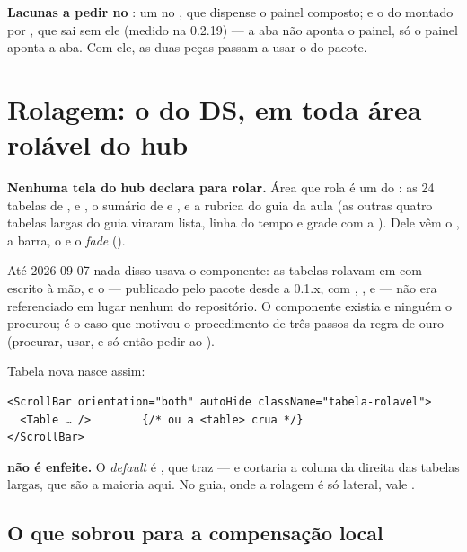 \textbf{Lacunas a pedir no }: um  no
, que dispense o painel composto; e o  do 
montado por , que sai sem ele (medido na 0.2.19) --- a aba não
aponta o painel, só o painel aponta a aba. Com ele, as duas peças passam a usar
o  do pacote.

\section{Rolagem: o  do DS, em toda área rolável do hub}
\label{ds:rolagem}

\textbf{Nenhuma tela do hub declara  para rolar.} Área que rola é um
 do : as 24 tabelas de ,
 e , o sumário de  e
, e a rubrica do guia da aula (as outras quatro tabelas largas do
guia viraram lista, linha do tempo e grade com a ). Dele vêm o ,
a barra, o  e o \emph{fade} ().

Até 2026-09-07 nada disso usava o componente: as tabelas rolavam em 
com  escrito à mão, e o  --- publicado pelo pacote
desde a 0.1.x, com , ,  e 
--- não era referenciado em lugar nenhum do repositório. O componente existia e
ninguém o procurou; é o caso que motivou o procedimento de três passos da regra
de ouro (procurar, usar, e só então pedir ao ).

Tabela nova nasce assim:

\begin{lstlisting}[language=tsunoo, caption={A forma canônica de uma tabela que rola}]
<ScrollBar orientation="both" autoHide className="tabela-rolavel">
  <Table … />        {/* ou a <table> crua */}
</ScrollBar>
\end{lstlisting}

\begin{atencao}
\textbf{ não é enfeite.} O \emph{default} é
, que traz  --- e cortaria a coluna da
direita das tabelas largas, que são a maioria aqui. No guia, onde a rolagem é só
lateral, vale .
\end{atencao}

\subsection{O que sobrou para a compensação local}

